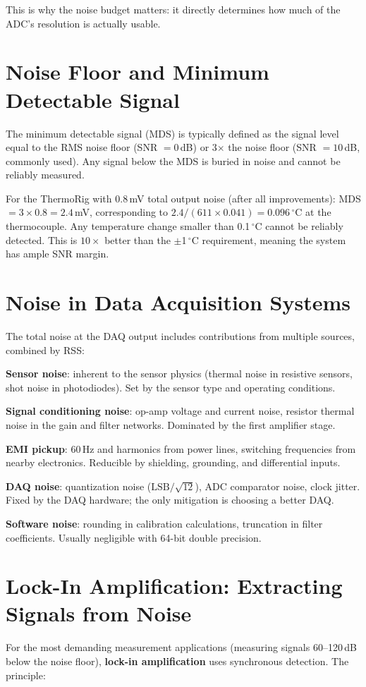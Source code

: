 \documentclass[11pt,letterpaper,twoside,openany]{book}
\newcommand{\degC}{\ensuremath{{}^{\circ}\text{C}}}
\begin{document}
This is why the noise budget matters: it directly determines how much of the ADC's resolution is actually usable.

\section{Noise Floor and Minimum Detectable Signal}
The minimum detectable signal (MDS) is typically defined as the signal level equal to the RMS noise floor (SNR $= 0$\,dB) or 3$\times$ the noise floor (SNR $= 10$\,dB, commonly used). Any signal below the MDS is buried in noise and cannot be reliably measured.

For the ThermoRig with 0.8\,mV total output noise (after all improvements): MDS $= 3 \times 0.8 = 2.4$\,mV, corresponding to $2.4/(611 \times 0.041) = 0.096$\,\degC{} at the thermocouple. Any temperature change smaller than 0.1\,\degC{} cannot be reliably detected. This is $10\times$ better than the $\pm$1\,\degC{} requirement, meaning the system has ample SNR margin.

\section{Noise in Data Acquisition Systems}
The total noise at the DAQ output includes contributions from multiple sources, combined by RSS:

\textbf{Sensor noise}: inherent to the sensor physics (thermal noise in resistive sensors, shot noise in photodiodes). Set by the sensor type and operating conditions.

\textbf{Signal conditioning noise}: op-amp voltage and current noise, resistor thermal noise in the gain and filter networks. Dominated by the first amplifier stage.

\textbf{EMI pickup}: 60\,Hz and harmonics from power lines, switching frequencies from nearby electronics. Reducible by shielding, grounding, and differential inputs.

\textbf{DAQ noise}: quantization noise ($\text{LSB}/\sqrt{12}$), ADC comparator noise, clock jitter. Fixed by the DAQ hardware; the only mitigation is choosing a better DAQ.

\textbf{Software noise}: rounding in calibration calculations, truncation in filter coefficients. Usually negligible with 64-bit double precision.

\section{Lock-In Amplification: Extracting Signals from Noise}
For the most demanding measurement applications (measuring signals 60--120\,dB below the noise floor), \textbf{lock-in amplification} uses synchronous detection. The principle:
\end{document}
